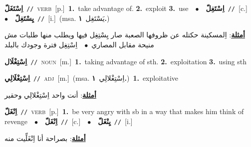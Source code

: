\documentclass[10pt,a4paper,twoside]{article} %
\begin{document}
\begin{multicols}{2}
{\setlength\topsep{0pt}\textbf{\foreignlanguage{arabic}{اِسْتَغَلّ}}\ {\color{gray}\texttt{//}\color{black}}\ \textsc{verb}\ [p.]\ \textbf{1.}~take advantage of.  \textbf{2.}~exploit  \textbf{3.}~use\ \ $\bullet$\ \ \setlength\topsep{0pt}\textbf{\foreignlanguage{arabic}{اِسْتَغِلّ}}\ {\color{gray}\texttt{//}\color{black}}\ [c.]\ \ $\bullet$\ \ \setlength\topsep{0pt}\textbf{\foreignlanguage{arabic}{يِسْتَغِلّ}}\ {\color{gray}\texttt{//}\color{black}}\ [i.]\ \color{gray}(msa. \foreignlanguage{arabic}{يَسْتَغِل}~\foreignlanguage{arabic}{\textbf{١.}})\color{black}\  \begin{flushright}\color{gray}\foreignlanguage{arabic}{\textbf{\underline{\foreignlanguage{arabic}{أمثلة}}}: اِلمسكينة حكتله عن ظروفها الصعبة صار يِسْتِغِل فيها ويطلب منها طلبات مش منيحة مقابل المصاري\ $\bullet$\ \  اِسْتِغِل فترة وجودك بالبلد}\end{flushright}\color{black}} \vspace{2mm}

{\setlength\topsep{0pt}\textbf{\foreignlanguage{arabic}{اِسْتِغْلَال}}\ {\color{gray}\texttt{//}\color{black}}\ \textsc{noun}\ [m.]\ \textbf{1.}~taking advantage of sth.  \textbf{2.}~exploitation  \textbf{3.}~using sth\ } \vspace{2mm}

{\setlength\topsep{0pt}\textbf{\foreignlanguage{arabic}{اِسْتِغْلَالِي}}\ {\color{gray}\texttt{//}\color{black}}\ \textsc{adj}\ [m.]\ \color{gray}(msa. \foreignlanguage{arabic}{اِسْتِغْلالِي}~\foreignlanguage{arabic}{\textbf{١.}})\color{black}\ \textbf{1.}~exploitative\  \begin{flushright}\color{gray}\foreignlanguage{arabic}{\textbf{\underline{\foreignlanguage{arabic}{أمثلة}}}: أنت واحد اِسْتِغْلالِي وحقير}\end{flushright}\color{black}} \vspace{2mm}

{\setlength\topsep{0pt}\textbf{\foreignlanguage{arabic}{اِنْغَلّ}}\ {\color{gray}\texttt{//}\color{black}}\ \textsc{verb}\ [p.]\ \textbf{1.}~be very angry with sb in a way that makes him think of revenge\ \ $\bullet$\ \ \setlength\topsep{0pt}\textbf{\foreignlanguage{arabic}{اِنْغَلّ}}\ {\color{gray}\texttt{//}\color{black}}\ [c.]\ \ $\bullet$\ \ \setlength\topsep{0pt}\textbf{\foreignlanguage{arabic}{يِنْغَلّ}}\ {\color{gray}\texttt{//}\color{black}}\ [i.]\  \begin{flushright}\color{gray}\foreignlanguage{arabic}{\textbf{\underline{\foreignlanguage{arabic}{أمثلة}}}: بصراحة أنا اِنْغَلِّيت منه}\end{flushright}\color{black}} \vspace{2mm}


\end{multicols}
\end{document}
